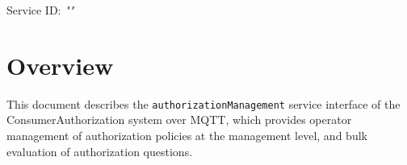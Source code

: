 \documentclass[a4paper]{arrowhead}
\begin{document}
\sloppy

\ArrowheadSetup

\begin{center}
  \vspace*{1cm}
  \huge{\arrowtitle}

  \vspace*{0.2cm}
  \LARGE{\arrowtype}
  \vspace*{1cm}

  \Large{Service ID: \textit{"\arrowid"}}

  \vspace*{\fill}


  \vspace*{1cm}
  \vspace*{\fill}

  \begin{abstract}
    This document describes the MQTT protocol with TLS payload security and JSON payload encoding variant of the \texttt{authorization\allowbreak{}Management} service of the ConsumerAuthorization system.
  \end{abstract}

  \vspace*{1cm}
\end{center}

\newpage

\tableofcontents
\newpage

\section{Overview}
\label{sec:overview}

This document describes the \texttt{authorization\allowbreak{}Management} service interface of the ConsumerAuthorization system over MQTT, which provides operator management of authorization policies at the management level, and bulk evaluation of authorization questions.
\end{document}
